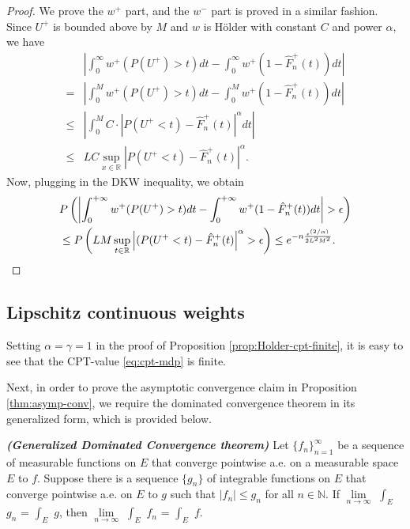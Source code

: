 \documentclass{article}
\numberwithin{equation}{section}
\numberwithin{theorem}{section}
\begin{document}
\begin{proof}
We prove the $w^+$ part, and the $w^-$ part is proved in a similar fashion.
Since $U^+$ is bounded above by $M$ and $w$ is H\"{o}lder with constant $C$ and power $\alpha$, we have
\begin{align*}
&\left|\int_0^{\infty} w^+(P(U^+)>t) dt- \int_0^{\infty} w^+(1- {\hat F^+_n}(t)) dt\right| \\ = &
    \left|\int_0^M w^+(P(U^+)>t) dt- \int_0^M w^+(1- {\hat F^+_n}(t)) dt\right| \\
\leq& \left|\int_0^M C\cdot |P(U^+<t)-{\hat F^+_n}(t)|^\alpha dt\right|\\ \leq& LC\sup_{x\in
\mathbb{R}}\left|P(U^+<t)-{\hat F^+_n}(t)\right|^\alpha.
\end{align*}
Now, plugging in the DKW inequality, we obtain
\begin{align}
&
P\left(\left|\intinfinity w^+(P(U^+)>t) dt- \intinfinity w^+(1- {\hat F^+_n}(t)) dt\right|>\epsilon\right)
\nonumber\\
& \leq P\left(LM\sup_{t\in \mathbb{R}} \left|(P(U^+<t)-{\hat F^+_n}(t)\right|^\alpha>\epsilon\right)
\leq  e^{-n \frac{\epsilon ^{(2/\alpha)}} {2 L^2 M^2}}.\label{eq:dkw3}
\end{align}
\end{proof}

\subsection{Lipschitz continuous weights}
\label{sec:lipschitz-proofs}

 Setting $\alpha=\gamma=1$ in the proof of Proposition \ref{prop:Holder-cpt-finite}, it is easy to see that the CPT-value \eqref{eq:cpt-mdp} is finite. 

Next, in order to prove the asymptotic convergence claim in Proposition \ref{thm:asymp-conv}, we require the dominated convergence theorem in its generalized form, which is provided below.
\begin{theorem}{\textbf{\textit{(Generalized Dominated Convergence theorem)}}}
Let $\{f_n\}_{n=1}^\infty$ be a sequence of measurable functions on $E$ that converge pointwise a.e. on a measurable space $E$ to $f$.  Suppose there is a sequence $\{g_n\}$ of integrable functions on $E$ that converge pointwise a.e. on $E$ to $g$ such that $|f_n| \leq g_n$ for all $n \in \mathbb{N}$.  
If $\lim\limits_{n \rightarrow \infty}$ $\int_E$ $g_n$ = $\int_E$ $g$, then $\lim\limits_{n \rightarrow \infty}$ $\int_E$ $f_n$ = $\int_E$ $f$.
\end{theorem}
\end{document}
